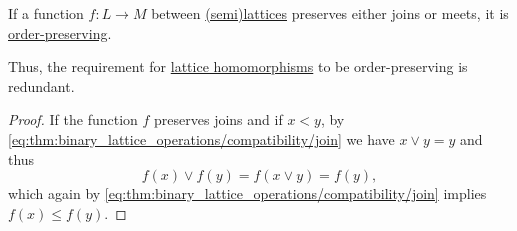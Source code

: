 \begin{corollary}\label{thm:lattice_homomorphism_is_monotone}
  If a function \( f: L \to M \) between \hyperref[def:semilattice]{(semi)lattices} preserves either joins or meets, it is \hyperref[def:order_homomorphism/increasing]{order-preserving}.

  Thus, the requirement for \hyperref[def:semilattice/homomorphism]{lattice homomorphisms} to be order-preserving is redundant.
\end{corollary}
\begin{proof}
  If the function \( f \) preserves joins and if \( x < y \), by \eqref{eq:thm:binary_lattice_operations/compatibility/join} we have \( x \vee y = y \) and thus
  \begin{equation*}
    f(x) \vee f(y) = f(x \vee y) = f(y),
  \end{equation*}
  which again by \eqref{eq:thm:binary_lattice_operations/compatibility/join} implies \( f(x) \leq f(y) \).
\end{proof}

